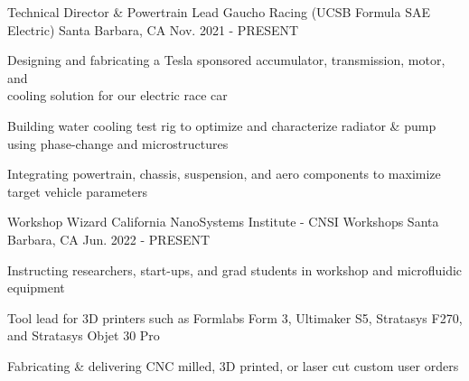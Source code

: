 

\begin{cventries}
\cventry
{Technical Director \& Powertrain Lead} %
{Gaucho Racing (UCSB Formula SAE Electric)} %
{Santa Barbara, CA} %
{Nov. 2021 - PRESENT} %
{ %
\begin{cvitems}   
\item {Designing and fabricating a Tesla sponsored accumulator, transmission, motor, and \\ cooling solution for our electric race car}
\item {Building water cooling test rig to optimize and characterize radiator \& pump using phase-change and microstructures}
\item {Integrating powertrain, chassis, suspension, and aero components to maximize target vehicle parameters}
\end{cvitems}
}


\cventry
{Workshop Wizard} %
{California NanoSystems Institute - CNSI Workshops} %
{Santa Barbara, CA} %
{Jun. 2022 - PRESENT} %
{ %
\begin{cvitems}
\item {Instructing researchers, start-ups, and grad students in workshop and microfluidic equipment}
\item {Tool lead for 3D printers such as Formlabs Form 3, Ultimaker S5, Stratasys F270, and Stratasys Objet 30 Pro}
\item {Fabricating \& delivering CNC milled, 3D printed, or laser cut custom user orders }
\end{cvitems}
}





\end{cventries}
